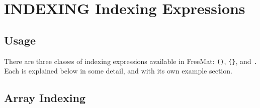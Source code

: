 \section{INDEXING Indexing Expressions}

\subsection{Usage}

There are three classes of indexing expressions available 
in FreeMat: \verb|()|, \verb|{}|, and \verb|.|  Each is explained below
in some detail, and with its own example section.
\subsection{Array Indexing}

